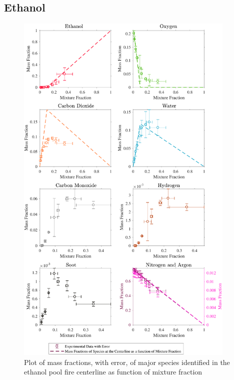 \documentclass[12pt]{article}
\begin{document}
\subsection{Ethanol}
\label{ssec:Ethanol_ALL_Mix_Frac}
\begin{figure}[h!]
	\centering
\includegraphics[width=10.5cm,keepaspectratio]{Ethanol_Mixture_Fraction_Major_Plot.pdf}
	\caption[Species mass fractions superimposed on ethanol state relations]{Plot of mass fractions, with error, of major species identified in the ethanol pool fire centerline as function of mixture fraction}
	\label{fig:Ethanol_MIX_Frac_Major}
\end{figure}

\pagebreak
\end{document}
